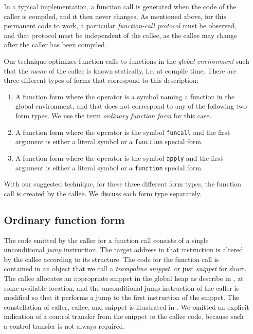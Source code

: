 In a typical implementation, a function call is generated when the
code of the caller is compiled, and it then never changes.  As
mentioned above, for this permanent code to work, a particular
\emph{function-call protocol} must be observed, and that protocol must
be independent of the callee, as the callee may change after the
caller has been compiled.

Our technique optimizes function calls to functions in the
\emph{global environment} such that the \emph{name} of the callee is
known statically, i.e. at compile time.  There are three different
types of forms that correspond to this description:

\begin{enumerate}
\item A function form where the operator is a symbol naming a function
  in the global environment, and that does not correspond to any of
  the following two form types.  We use the term \emph{ordinary
    function form} for this case.
\item A function form where the operator is the symbol
  \texttt{funcall} and the first argument is either a literal symbol
  or a \texttt{function} special form.
\item A function form where the operator is the symbol
  \texttt{apply} and the first argument is either a literal symbol
  or a \texttt{function} special form.
\end{enumerate}

With our suggested technique, for these three different form types,
the function call is created by the callee.  We discuss each form type
separately.

\subsection{Ordinary function form}

The code emitted by the caller for a function call consists of a
single unconditional \emph{jump} instruction.  The target address in
that instruction is altered by the callee according to its structure.
The code for the function call is contained in an object that we call
a \emph{trampoline snippet}, or just \emph{snippet} for short.  The
callee allocates an appropriate snippet in the global heap as describe
in , at some available location, and the
unconditional jump instruction of the caller is modified so that it
performs a jump to the first instruction of the snippet.  The
constellation of caller, callee, and snippet is illustrated in
.  We omitted an explicit indication of a control
transfer from the snippet to the callee code, because such a control
transfer is not always required.

